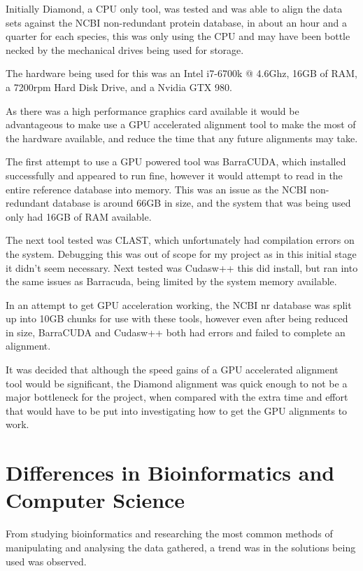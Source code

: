 Initially Diamond\cite{diamond}, a CPU only tool, was tested and was able to align the data sets against the NCBI\cite{ncbi} non-redundant protein database\cite{nr}, in about an hour and a quarter for each species, this was only using the CPU and may have been bottle necked by the mechanical drives being used for storage. 

The hardware being used for this was an Intel i7-6700k @ 4.6Ghz, 16GB of RAM, a 7200rpm Hard Disk Drive, and a Nvidia GTX 980. 

As there was a high performance graphics card available it would be advantageous to make use a GPU accelerated alignment tool to make the most of the hardware available, and reduce the time that any future alignments may take. 

The first attempt to use a GPU powered tool was BarraCUDA\cite{barracuda}, which installed successfully and appeared to run fine, however it would attempt to read in the entire reference database into memory. This was an issue as the NCBI non-redundant database is around 66GB in size, and the system that was being used only had 16GB of RAM available. 

The next tool tested was CLAST\cite{clast}, which unfortunately had compilation errors on the system. Debugging this was out of scope for my project as in this initial stage it didn't seem necessary. Next tested was Cudasw++\cite{cudasw} this did install, but ran into the same issues as Barracuda, being limited by the system memory available. 

In an attempt to get GPU acceleration working, the NCBI nr database was split up into 10GB chunks for use with these tools, however even after being reduced in size, BarraCUDA and Cudasw++ both had errors and failed to complete an alignment. 

It was decided that although the speed gains of a GPU accelerated alignment tool would be significant, the Diamond alignment was quick enough to not be a major bottleneck for the project, when compared with the extra time and effort that would have to be put into investigating how to get the GPU alignments to work. 

\section{Differences in Bioinformatics and Computer Science}
From studying bioinformatics and researching the most common methods of manipulating and analysing the data gathered, a trend was in the solutions being used was observed. 


